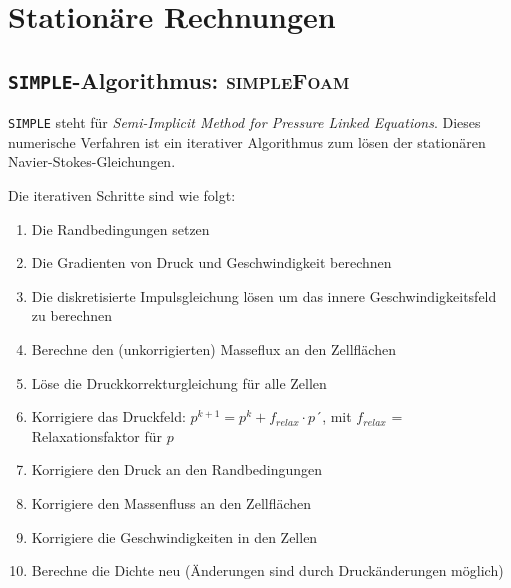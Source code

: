 \chapter{Stationäre Rechnungen}

\section{\texttt{SIMPLE}-Algorithmus: \textsc{simpleFoam}}

\texttt{SIMPLE} steht für \textit{Semi-Implicit Method for Pressure Linked Equations}. Dieses numerische Verfahren ist ein iterativer Algorithmus zum lösen der stationären Navier-Stokes-Gleichungen.

Die iterativen Schritte sind wie folgt:

\begin{enumerate}
\item Die Randbedingungen setzen
\item Die Gradienten von Druck und Geschwindigkeit berechnen
\item Die diskretisierte Impulsgleichung lösen um das innere Geschwindigkeitsfeld zu berechnen
\item Berechne den (unkorrigierten) Masseflux an den Zellflächen
\item Löse die Druckkorrekturgleichung für alle Zellen
\item Korrigiere das Druckfeld: $ p^{k+1} = p^{k} + f_{relax} \cdot p´ $, mit $ f_{relax} $ = Relaxationsfaktor für $ p $
\item Korrigiere den Druck an den Randbedingungen
\item Korrigiere den Massenfluss an den Zellflächen
\item Korrigiere die Geschwindigkeiten in den Zellen
\item Berechne die Dichte neu (Änderungen sind durch Druckänderungen möglich)
\end{enumerate}

\newpage